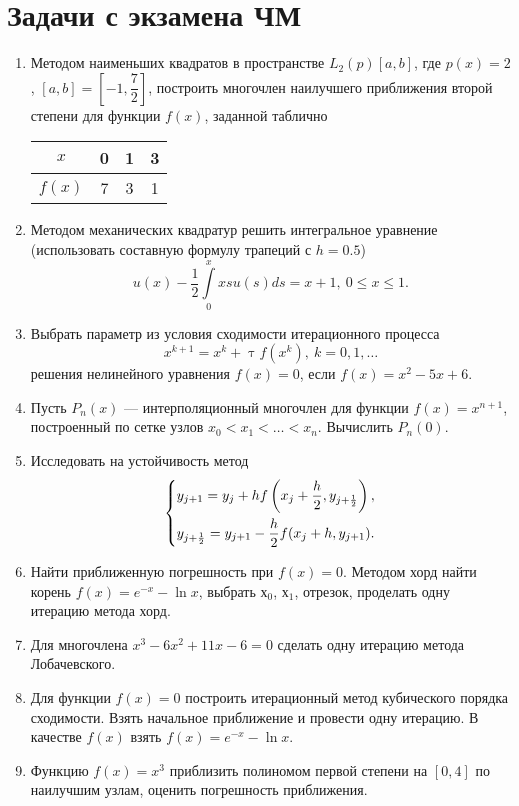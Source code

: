 \documentclass[a4paper, 12pt]{article}
\renewcommand{\leq}{\leqslant}
\renewcommand{\tau}{\uptau}
\begin{document}
	\section*{Задачи с экзамена ЧМ}
	\begin{enumerate}
		\item Методом наименьших квадратов в пространстве $L_2(p)[a,b]$, где $p(x) = 2$, $[a,b] = \left[-1, \dfrac72\right]$, построить многочлен наилучшего приближения второй степени для функции $f(x)$, заданной таблично
		\begin{center}\begin{tabular}[t]{|c|c|c|c|}
				\hline
				$x$ & 0 & 1 & 3 \\
				\hline
				$f(x)$ & 7 & 3 & 1 \\
				\hline
		\end{tabular}\end{center}
		\item Методом механических квадратур решить интегральное уравнение (использовать составную формулу трапеций с $h=0.5$)
		$$u(x) - \dfrac12 \int\limits_0^x x s u(s)ds = x+1,\ 0\leq x \leq 1.$$
		\item Выбрать параметр из условия сходимости итерационного процесса $$x^{k+1} = x^k + \tau f(x^k), \ k=0,1,\ldots$$
		решения нелинейного уравнения $f(x) = 0$, если $f(x)=x^2-5x+6$.
		\item Пусть $P_n(x)$ --- интерполяционный многочлен для функции $f(x)=x^{n+1}$, построенный по сетке узлов $x_0 < x_1 < \ldots < x_n$. Вычислить $P_n(0)$.
		\item Исследовать на устойчивость метод
		$$\begin{dcases}
			y_{j+1} = y_j + hf\left(x_j + \dfrac h2, y_{j+\frac12}\right),\\
			y_{j+\frac12} = y_{j+1} - \dfrac h2 f(x_j+h,y_{j+1}).
		\end{dcases}$$
		\item Найти приближенную погрешность при $f(x)=0$. Методом хорд найти корень $f(x) = e^{-x}-\ln x$, выбрать $х_0$, $х_1$, отрезок, проделать одну итерацию метода хорд.
		\item Для многочлена $x^3 - 6x^2 + 11x - 6 = 0$ сделать одну итерацию метода Лобачевского.
		\item Для функции $f(x)=0$ построить итерационный метод кубического порядка сходимости. Взять начальное приближение и провести одну итерацию. В качестве $f(x)$ взять $f(x) = e^{-x}-\ln x$.
		\item Функцию $f(x) = x^3$ приблизить полиномом первой степени на $[0,4]$ по наилучшим узлам, оценить погрешность приближения.

\end{enumerate}
\end{document}
